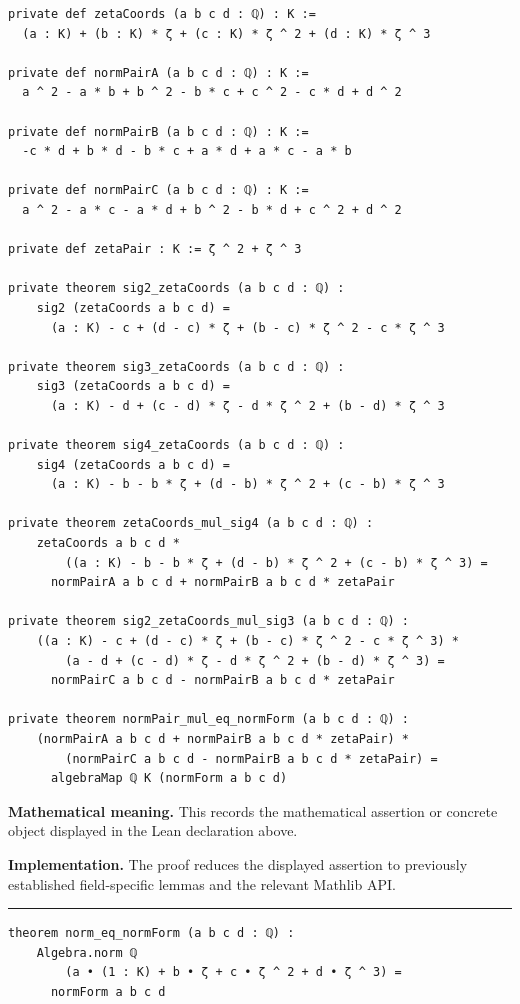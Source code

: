 \documentclass[UTF8,a4paper,11pt,fontset=fandol]{ctexart}
\theoremstyle{definition}
\newcommand{\statementsep}{\par\medskip\hrule\medskip}
\begin{document}
\begin{verbatim}
private def zetaCoords (a b c d : ℚ) : K :=
  (a : K) + (b : K) * ζ + (c : K) * ζ ^ 2 + (d : K) * ζ ^ 3

private def normPairA (a b c d : ℚ) : K :=
  a ^ 2 - a * b + b ^ 2 - b * c + c ^ 2 - c * d + d ^ 2

private def normPairB (a b c d : ℚ) : K :=
  -c * d + b * d - b * c + a * d + a * c - a * b

private def normPairC (a b c d : ℚ) : K :=
  a ^ 2 - a * c - a * d + b ^ 2 - b * d + c ^ 2 + d ^ 2

private def zetaPair : K := ζ ^ 2 + ζ ^ 3

private theorem sig2_zetaCoords (a b c d : ℚ) :
    sig2 (zetaCoords a b c d) =
      (a : K) - c + (d - c) * ζ + (b - c) * ζ ^ 2 - c * ζ ^ 3

private theorem sig3_zetaCoords (a b c d : ℚ) :
    sig3 (zetaCoords a b c d) =
      (a : K) - d + (c - d) * ζ - d * ζ ^ 2 + (b - d) * ζ ^ 3

private theorem sig4_zetaCoords (a b c d : ℚ) :
    sig4 (zetaCoords a b c d) =
      (a : K) - b - b * ζ + (d - b) * ζ ^ 2 + (c - b) * ζ ^ 3

private theorem zetaCoords_mul_sig4 (a b c d : ℚ) :
    zetaCoords a b c d *
        ((a : K) - b - b * ζ + (d - b) * ζ ^ 2 + (c - b) * ζ ^ 3) =
      normPairA a b c d + normPairB a b c d * zetaPair

private theorem sig2_zetaCoords_mul_sig3 (a b c d : ℚ) :
    ((a : K) - c + (d - c) * ζ + (b - c) * ζ ^ 2 - c * ζ ^ 3) *
        (a - d + (c - d) * ζ - d * ζ ^ 2 + (b - d) * ζ ^ 3) =
      normPairC a b c d - normPairB a b c d * zetaPair

private theorem normPair_mul_eq_normForm (a b c d : ℚ) :
    (normPairA a b c d + normPairB a b c d * zetaPair) *
        (normPairC a b c d - normPairB a b c d * zetaPair) =
      algebraMap ℚ K (normForm a b c d)
\end{verbatim}
\noindent\textbf{Mathematical meaning.} This records the mathematical assertion or concrete object displayed in the Lean declaration above.\par
\noindent\textbf{Implementation.} The proof reduces the displayed assertion to previously established field-specific lemmas and the relevant Mathlib API.\par
\statementsep
\begin{verbatim}
theorem norm_eq_normForm (a b c d : ℚ) :
    Algebra.norm ℚ
        (a • (1 : K) + b • ζ + c • ζ ^ 2 + d • ζ ^ 3) =
      normForm a b c d
\end{verbatim}
\end{document}
